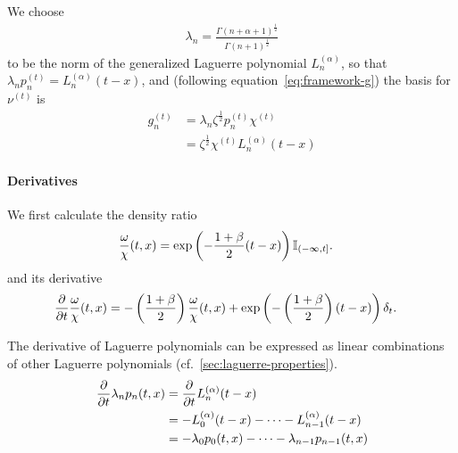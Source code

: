 \documentclass[../../hippo]{subfiles}
\begin{document}
We choose
\begin{align*}
  \lambda_n = \frac{\Gamma(n+\alpha+1)^{\frac{1}{2}}}{\Gamma(n+1)^{\frac{1}{2}}}
\end{align*}
to be the norm of the generalized Laguerre polynomial $L_n^{(\alpha)}$,
so that $\lambda_n p_n^{(t)} = L_n^{(\alpha)}(t-x)$,
and (following equation~\eqref{eq:framework-g}) the basis for $\nu^{(t)}$ is
\begin{equation}%
  \begin{aligned}
    g_n^{(t)} &= \lambda_n \zeta^{\frac{1}{2}} p_n^{(t)} \chi^{(t)}
    \\
    &= \zeta^{\frac{1}{2}} \chi^{(t)} L_n^{(\alpha)}(t-x)
  \end{aligned}
\end{equation}



\paragraph{Derivatives}

We first calculate the density ratio
\begin{align*}%
  \frac{\omega}{\chi}(t, x) &= \exp \left( -\frac{1+\beta}{2} (t-x) \right) \mathbb{I}_{\Rn{t}}
  .
\end{align*}
and its derivative
\begin{align*}
  \frac{\partial}{\partial t} \frac{\omega}{\chi}(t, x)
  &= -\left( \frac{1+\beta}{2} \right)\frac{\omega}{\chi}(t, x) + \exp\left( -\left( \frac{1+\beta}{2} \right)(t-x) \right) \delta_t
  .
\end{align*}

The derivative of Laguerre polynomials can be expressed as linear combinations of
other Laguerre polynomials (cf.\ \cref{sec:laguerre-properties}).
\begin{align*}
  \frac{\partial}{\partial t} \lambda_n p_n(t, x)
  &= \frac{\partial}{\partial t} L^{(\alpha)}_n(t-x)
  \\
  &= -L^{(\alpha)}_0(t-x) - \dots - L^{(\alpha)}_{n-1}(t-x)
  \\
  &= -\lambda_0 p_0(t, x) - \dots - \lambda_{n-1} p_{n-1}(t, x)
\end{align*}
\end{document}
